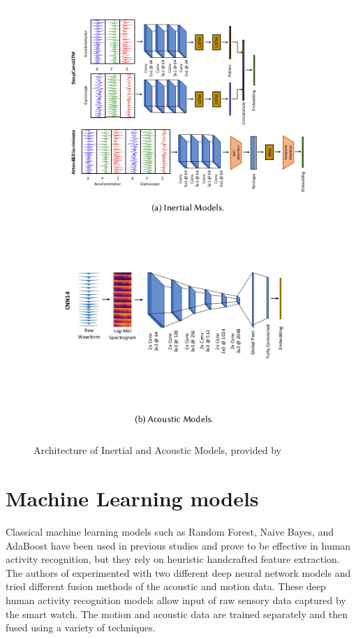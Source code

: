 \documentclass[conference]{IEEEtran}
\begin{document}
	\begin{figure}[h]
		\centering
		\includegraphics[scale=0.50]{Architecture_of_Inertial_and_Acoustic_Models}
		\caption{Architecture of Inertial and Acoustic Models, provided by \cite{2022_Leveraging_sound}}
		\label{fig: Architecture_of_Inertial_and_Acoustic_Models}
	\end{figure}
	
	\section{Machine Learning models}
	Classical machine learning models such as Random Forest, Naive Bayes, and AdaBoost have been used in previous studies and prove to be effective in human activity recognition, but they rely on heuristic handcrafted feature extraction. The authors of \cite{2022_Leveraging_sound} experimented with two different deep neural network models and tried different fusion methods of the acoustic and motion data.  These deep human activity recognition models allow input of raw sensory data captured by the smart watch. The motion and acoustic data are trained separately and then fused using a variety of techniques.
	
\end{document}
